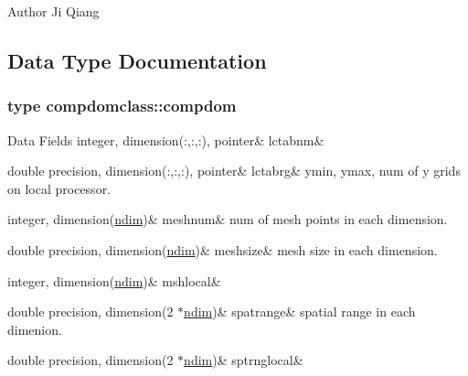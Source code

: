 \begin{DoxyAuthor}{Author}
Ji Qiang 
\end{DoxyAuthor}


\subsection{Data Type Documentation}
\label{structcompdomclass_1_1compdom}
\subsubsection{type compdomclass\+::compdom}
\begin{DoxyFields}{Data Fields}
\mbox{\label{namespacecompdomclass_aebcef97b10bb06dc69848b22acaffe70}} 
integer, dimension(:,:,:), pointer&
lctabnm&
\\
\hline

\mbox{\label{namespacecompdomclass_a339ff58ad4edb52e01cf217b9a7f081c}} 
double precision, dimension(:,:,:), pointer&
lctabrg&
ymin, ymax, num of y grids on local processor. \\
\hline

\mbox{\label{namespacecompdomclass_a80b917ff817964bc120175119768f93e}} 
integer, dimension(\mbox{\hyperlink{namespacecompdomclass_a01f031d8af670f66db4484cd6411e99f}{ndim}})&
meshnum&
num of mesh points in each dimension. \\
\hline

\mbox{\label{namespacecompdomclass_a13c6277e9ca60fa6a80081b2a0bc91ff}} 
double precision, dimension(\mbox{\hyperlink{namespacecompdomclass_a01f031d8af670f66db4484cd6411e99f}{ndim}})&
meshsize&
mesh size in each dimension. \\
\hline

\mbox{\label{namespacecompdomclass_a21d05738eabd33f56f26879055af6343}} 
integer, dimension(\mbox{\hyperlink{namespacecompdomclass_a01f031d8af670f66db4484cd6411e99f}{ndim}})&
mshlocal&
\\
\hline

\mbox{\label{namespacecompdomclass_a55068267999d67699122c91b366a0682}} 
double precision, dimension(2 $\ast$\mbox{\hyperlink{namespacecompdomclass_a01f031d8af670f66db4484cd6411e99f}{ndim}})&
spatrange&
spatial range in each dimenion. \\
\hline

\mbox{\label{namespacecompdomclass_a2a2654ff7dd41dbb57b11a089e568123}} 
double precision, dimension(2 $\ast$\mbox{\hyperlink{namespacecompdomclass_a01f031d8af670f66db4484cd6411e99f}{ndim}})&
sptrnglocal&
\\
\hline

\end{DoxyFields}


